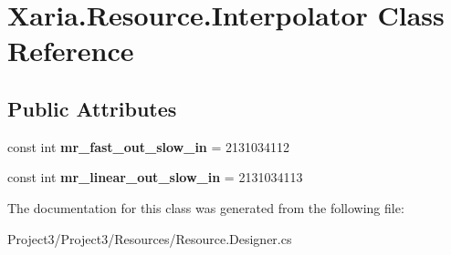 \hypertarget{classXaria_1_1Resource_1_1Interpolator}{}\section{Xaria.\+Resource.\+Interpolator Class Reference}
\label{classXaria_1_1Resource_1_1Interpolator}
\subsection*{Public Attributes}
\begin{DoxyCompactItemize}
\item 
\mbox{\label{classXaria_1_1Resource_1_1Interpolator_aca2c1703055ffbd306cd0cfde65bc5e7}} 
const int {\bfseries mr\+\_\+fast\+\_\+out\+\_\+slow\+\_\+in} = 2131034112
\item 
\mbox{\label{classXaria_1_1Resource_1_1Interpolator_ab45a4e361b290421613f4911f2364728}} 
const int {\bfseries mr\+\_\+linear\+\_\+out\+\_\+slow\+\_\+in} = 2131034113
\end{DoxyCompactItemize}


The documentation for this class was generated from the following file\+:\begin{DoxyCompactItemize}
\item 
Project3/\+Project3/\+Resources/Resource.\+Designer.\+cs\end{DoxyCompactItemize}
